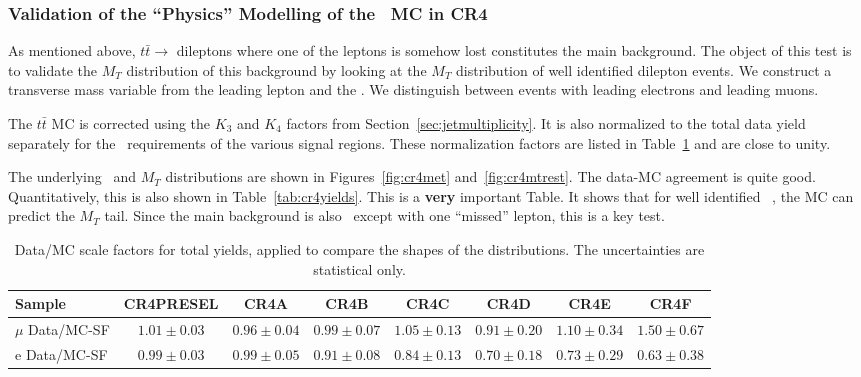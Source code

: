 \clearpage



\subsubsection{Validation of the ``Physics'' Modelling of the \ttdl\
  MC in CR4}
\label{sec:CR4-valid}

As mentioned above, $t\bar{t} \to $ dileptons where one of the leptons
is somehow lost constitutes the main background.
The object of this test is to validate the $M_T$ distribution of this
background by looking at the $M_T$ distribution of well identified
dilepton events.
We construct a transverse mass variable from the leading lepton and
the \met.  We distinguish between events with leading electrons and
leading muons.  

The $t\bar{t}$ MC is corrected using the $K_3$ and $K_4$ factors
from Section~\ref{sec:jetmultiplicity}.  It is also normalized to the 
total data yield separately for the \met\ requirements of the various signal
regions.  These normalization factors are listed
in Table~\ref{tab:cr4mtsf} and are close to unity.

The underlying \met\ and $M_T$ distributions are shown in 
Figures~\ref{fig:cr4met} and~\ref{fig:cr4mtrest}.  The data-MC agreement
is quite good.  Quantitatively, this is also shown in Table~\ref{tab:cr4yields}.
This is a {\bf very} important Table.  It shows that for well
identified \ttdl\ , the MC can predict the $M_T$ tail.  Since the
main background is also \ttdl\ except with one ``missed'' lepton, 
this is a key test.

\begin{table}[!h]
\begin{center}
{\footnotesize
\begin{tabular}{l||c||c|c|c|c|c|c}
\hline
Sample              & CR4PRESEL & CR4A & CR4B & CR4C &
CR4D & CR4E & CR4F\\
\hline
\hline
$\mu$ Data/MC-SF 	  & $1.01 \pm 0.03$ & $0.96 \pm 0.04$ & $0.99 \pm 0.07$ & $1.05 \pm 0.13$ & $0.91 \pm 0.20$ & $1.10 \pm 0.34$ & $1.50 \pm 0.67$ \\
\hline
\hline
e Data/MC-SF 	  & $0.99 \pm 0.03$ & $0.99 \pm 0.05$ & $0.91 \pm 0.08$ & $0.84 \pm 0.13$ & $0.70 \pm 0.18$ & $0.73 \pm 0.29$ & $0.63 \pm 0.38$ \\
\hline
\end{tabular}}
\caption{ Data/MC scale factors for total yields, applied to compare
  the shapes of the distributions.
  The uncertainties are statistical only.
\label{tab:cr4mtsf}}
\end{center}
\end{table}


